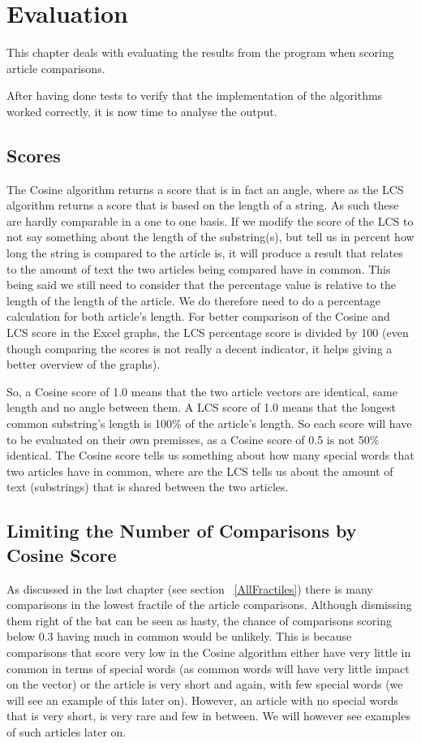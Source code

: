 \chapter{Evaluation}
This chapter deals with evaluating the results from the program when scoring article comparisons.

After having done tests to verify that the implementation of the algorithms worked correctly, it is now time to analyse the output.

\section{Scores}

The Cosine algorithm returns a score that is in fact an angle, where as the LCS algorithm returns a score that is based on the length of a string. As such these are hardly comparable in a one to one basis. If we modify the score of the LCS to not say something about the length of the substring(s), but tell us in percent how long the string is compared to the article is, it will produce a result that relates to the amount of text the two articles being compared have in common. This being said we still need to consider that the percentage value is relative to the length of the length of the article. We do therefore need to do a percentage calculation for both article's length. For better comparison of the Cosine and LCS score in the Excel graphs, the LCS percentage score is divided by 100 (even though comparing the scores is not really a decent indicator, it helps giving a better overview of the graphs).

So, a Cosine score of 1.0 means that the two article vectors are identical, same length and no angle between them. A LCS score of 1.0 means that the longest common substring's length is 100\% of the article's length. So each score will have to be evaluated on their own premisses, as a Cosine score of 0.5 is not 50\% identical. The Cosine score tells us something about how many special words that two articles have in common, where are the LCS tells us about the amount of text (substrings) that is shared between the two articles.

\section{Limiting the Number of Comparisons by Cosine Score}

As discussed in the last chapter (see section ~\ref{AllFractiles}) there is many comparisons in the lowest fractile of the article comparisons. Although dismissing them right of the bat can be seen as hasty, the chance of comparisons scoring below 0.3 having much in common would be unlikely. This is because comparisons that score very low in the Cosine algorithm either have very little in common in terms of special words (as common words will have very little impact on the vector) or the article is very short and again, with few special words (we will see an example of this later on). However, an article with no special words that is very short, is very rare and few in between. We will however see examples of such articles later on.

